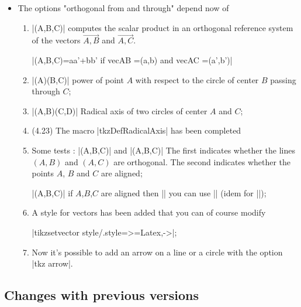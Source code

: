 \begin{itemize}
\item The options "orthogonal from and through" depend now of 

\begin{enumerate}
  
  \item |\tkzDotProduct(A,B,C)| computes the scalar product in an orthogonal reference system of the vectors $\overrightarrow{A,B}$ and $\overrightarrow{A,C}$. 
  
  |\tkzDotProduct(A,B,C)=aa'+bb' if vec{AB} =(a,b) and vec{AC} =(a',b')|
  
  
  \item |\tkzPowerCircle(A)(B,C)| power of point $A$ with respect to the circle of center $B$ passing through $C$;
  
  
  \item |\tkzDefRadicalAxis(A,B)(C,D)| Radical axis of two circles of center $A$ and $C$;


\item (4.23) The macro |tkzDefRadicalAxis| has been completed
  
  \item Some tests : |\tkzIsOrtho(A,B,C)| and |\tkzIsLinear(A,B,C)| The first indicates whether the lines $(A,B)$ and $(A,C)$ are orthogonal. The second indicates whether the points $A$, $B$ and $C$ are aligned;

 |\tkzIsLinear(A,B,C)| if $A$,$B$,$C$ are aligned then |\tkzLineartrue|
  you can use |\iftkzLinear| (idem for |\tkzIsOrtho|);

\item A style for vectors has been added that you can of course modify

|tikzset{vector style/.style={>=Latex,->}}|;


\item Now it's possible to add an arrow on a line or a circle with the option |tkz arrow|. 
\end{enumerate}
\end{itemize}

\subsection{Changes with previous versions} %
\label{sub:changes_with_previous_versions}

